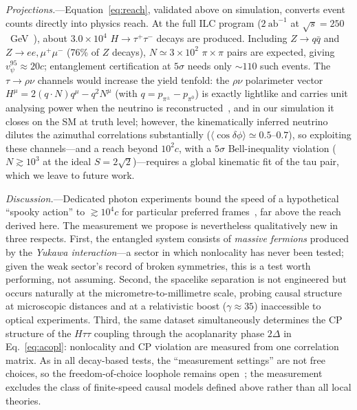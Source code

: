 \documentclass[prl,twocolumn,superscriptaddress,floatfix]{revtex4-2}
\newcommand{\tautau}{\tau^+\tau^-}
\newcommand{\mumu}{\mu^+\mu^-}
\newcommand{\Htautau}{H\!\to\!\tautau}
\newcommand{\vpsi}{v_\psi}
\newcommand{\sqrts}{\sqrt{s}}
\begin{document}
\textit{Projections.}---Equation~\eqref{eq:reach}, validated above on
simulation, converts event counts directly into physics reach.  At
the full ILC program ($2~\mathrm{ab}^{-1}$ at
$\sqrts=250$~GeV~\cite{ILC_TDR}), about $3.0\times10^4$ $\Htautau$
decays are produced.  Including $Z\to q\bar q$ and $Z\to ee,\mumu$
(76\% of $Z$ decays), $N\simeq3\times10^2$ $\pi{\times}\pi$ pairs are
expected, giving $\vpsi^{95}\approx20c$; entanglement certification
at $5\sigma$ needs only ${\sim}110$ such events.  The
$\tau\to\rho\nu$ channels would increase the yield tenfold: the
$\rho\nu$ polarimeter vector $H^\mu=2(q\!\cdot\!N)q^\mu-q^2N^\mu$
(with $q=p_{\pi^\pm}-p_{\pi^0}$) is exactly lightlike and carries
unit analysing power when the neutrino is
reconstructed~\cite{Kuhn1995}, and in our simulation it closes on the
SM at truth level; however, the kinematically inferred neutrino
dilutes the azimuthal correlations substantially
($\langle\cos\delta\phi\rangle\simeq0.5$--$0.7$), so exploiting these
channels---and a reach beyond $10^{2}c$, with a $5\sigma$
Bell-inequality violation ($N\gtrsim10^3$ at the ideal
$S=2\sqrt2$)---requires a global kinematic fit of the tau pair, which
we leave to future work.


\textit{Discussion.}---Dedicated photon experiments bound the speed
of a hypothetical ``spooky action'' to
$\gtrsim10^{4}c$ for particular preferred frames~\cite{Salart2008},
far above the reach derived here.  The measurement we propose is
nevertheless qualitatively new in three respects.  First, the
entangled system consists of \emph{massive fermions} produced by the
\emph{Yukawa interaction}---a sector in which nonlocality has never
been tested; given the weak sector's record of broken symmetries,
this is a test worth performing, not assuming.  Second, the
spacelike separation is not engineered but occurs naturally at the
micrometre-to-millimetre scale, probing causal structure at
microscopic distances and at a relativistic boost
($\gamma\approx35$) inaccessible to optical experiments.  Third, the
same dataset simultaneously determines the CP structure of the
$H\tau\tau$ coupling through the acoplanarity phase $2\Delta$ in
Eq.~\eqref{eq:acopl}: nonlocality and CP violation are measured from
one correlation matrix.  As in all decay-based tests, the
``measurement settings'' are not free choices, so the
freedom-of-choice loophole remains open~\cite{Abel1992}; the
measurement excludes the class of finite-speed causal models defined
above rather than all local theories.
\end{document}
